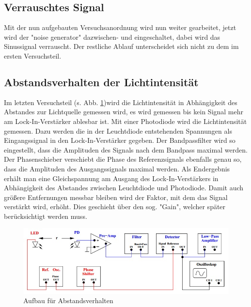 \subsection{Verrauschtes Signal}

Mit der nun aufgebauten Versuchsanordnung wird nun weiter gearbeitet,
jetzt wird der "noise generator" dazwischen- und eingeschaltet, dabei wird das Sinussignal verrauscht. Der restliche Ablauf unterscheidet sich nicht zu dem im ersten Versuchsteil.

\subsection{Abstandsverhalten der Lichtintensität}

Im letzten Versuchsteil (s. Abb. \ref{fig:Aufbau2})wird die Lichtintensität in Abhängigkeit des Abstandes zur Lichtquelle gemessen wird, es wird gemessen bis kein Signal mehr am Lock-In-Verstärker ablesbar ist. Mit einer Photodiode wird die Lichtintensität gemessen. Dazu werden die in der Leuchtdiode entstehenden Spannungen als Eingangssignal in den Lock-In-Verstärker gegeben. Der Bandpassfilter wird so eingestellt, dass die Amplituden des Signals nach dem Bandpass maximal werden. Der Phasenschieber verschiebt die Phase des Referenzsignals ebenfalls genau so, dass die Amplituden des Ausgangssignals maximal werden. Als Endergebnis erhält man eine Gleichspannung am Ausgang des Lock-In-Verstärkers in Abhängigkeit des Abstandes zwischen Leuchtdiode und Photodiode. Damit auch größere Entfernungen messbar bleiben wird der Faktor, mit dem das Signal verstärkt wird, erhöht. Dies geschieht über den sog. "Gain", welcher später berücksichtigt werden muss.



\begin{figure}[h]
       \includegraphics[scale=0.8]{Grafiken/V303Aufbau2.jpg}
       \caption{Aufbau für Abstandsverhalten}
       \label{fig:Aufbau2}
\end{figure}
